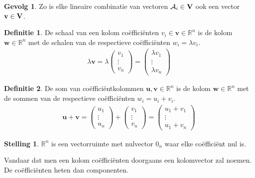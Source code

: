 \documentclass{amsart}
\theoremstyle{definition}
\newtheorem{thm}{Stelling}[section]
\newtheorem{dfn}{Definitie}[section]
\newtheorem{csq}{Gevolg}[section]
\newcommand{\realnums}{\mathbb{R}}
\newcommand{\realn}[1][n]{\realnums^{#1}}
\newcommand{\vecspace}[1][v]{\mathrm{\mathbf{\MakeUppercase#1}}}
\newcommand{\vvec}[1][v]{\mathbf{#1}}
\newcommand{\vecrow}[1][a]{\mathcal{\MakeUppercase{#1}}}
\newcommand{\rvec}[2][i]{{#2}_{#1}}
\newcommand{\rvecr}[2][i]{\rvec[#1]{\vecrow[#2]}}
\newcommand{\rveci}[1][i]{\rvecr[#1]{a}}
\begin{document}
\begin{csq}
	Zo is elke lineaire combinatie van vectoren $\rveci \in \vecspace$ ook een vector $\vvec \in \vecspace$.
\end{csq}

\begin{dfn}
	De schaal van een kolom coëfficiënten $v_i \in \vvec \in \realn$ is de kolom $\vvec[w] \in \realn$ met de schalen van de respectieve coëfficiënten ${w}_i = \lambda {v}_i$.
	\begin{align*}
		\lambda \vvec =
		\lambda 
		\begin{pmatrix}
			v_1 \\
			\vdots \\
			v_n
		\end{pmatrix}
		= 
		\begin{pmatrix}
			\lambda v_1 \\
			\vdots \\
			\lambda v_n
		\end{pmatrix}
	\end{align*}
\end{dfn}

\begin{dfn}
	De som van coëfficiëntkolommen $\vvec[u], \vvec \in \realn$ is de kolom $\vvec[w] \in \realn$ met de sommen van de respectieve coëfficiënten ${w}_i = {u}_i + {v}_i$.
	\begin{align*}
		\vvec[u] + \vvec =
		\begin{pmatrix}
			u_1 \\
			\vdots \\
			u_n
		\end{pmatrix}
		+
		\begin{pmatrix}
			v_1 \\
			\vdots \\
			v_n
		\end{pmatrix}
		=
		\begin{pmatrix}
			u_1 + v_1 \\
			\vdots \\
			u_1 + v_n
		\end{pmatrix}
	\end{align*}
\end{dfn}

\begin{thm}
	$\realn$ is een vectorruimte met nulvector $0_n$ waar elke coëfficiënt nul is.
\end{thm}

Vandaar dat men een kolom coëfficiënten doorgaans een kolomvector zal noemen. De coëfficiënten heten dan componenten.
\end{document}
